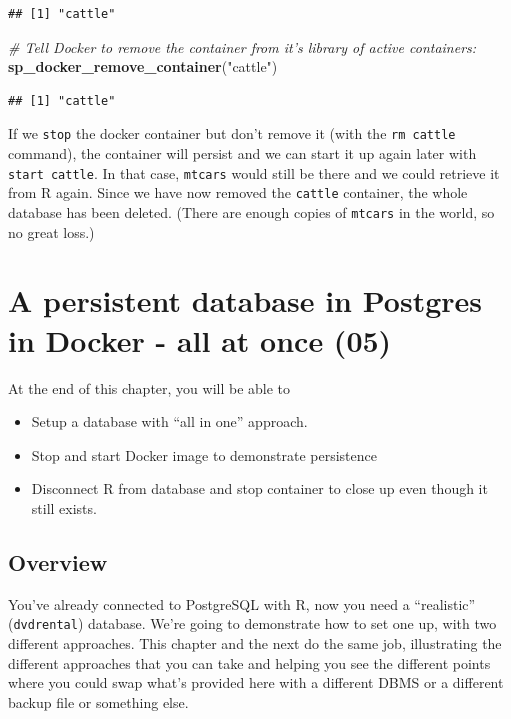 \documentclass[]{book}
\newenvironment{Shaded}{\begin{snugshade}}{\end{snugshade}}
\newcommand{\CommentTok}[1]{\textcolor[rgb]{0.56,0.35,0.01}{\textit{#1}}}
\newcommand{\KeywordTok}[1]{\textcolor[rgb]{0.13,0.29,0.53}{\textbf{#1}}}
\newcommand{\NormalTok}[1]{#1}
\newcommand{\StringTok}[1]{\textcolor[rgb]{0.31,0.60,0.02}{#1}}
\providecommand{\tightlist}{%
  \setlength{\itemsep}{0pt}\setlength{\parskip}{0pt}}
\theoremstyle{definition}
\theoremstyle{definition}
\theoremstyle{definition}
\theoremstyle{remark}
\begin{document}
\begin{verbatim}
## [1] "cattle"
\end{verbatim}

\begin{Shaded}
\begin{Highlighting}[]
\CommentTok{# Tell Docker to remove the container from it's library of active containers:}
\KeywordTok{sp_docker_remove_container}\NormalTok{(}\StringTok{"cattle"}\NormalTok{)}
\end{Highlighting}
\end{Shaded}

\begin{verbatim}
## [1] "cattle"
\end{verbatim}

If we \texttt{stop} the docker container but don't remove it (with the
\texttt{rm\ cattle} command), the container will persist and we can
start it up again later with \texttt{start\ cattle}. In that case,
\texttt{mtcars} would still be there and we could retrieve it from R
again. Since we have now removed the \texttt{cattle} container, the
whole database has been deleted. (There are enough copies of
\texttt{mtcars} in the world, so no great loss.)

\hypertarget{a-persistent-database-in-postgres-in-docker---all-at-once-05}{%
\chapter{A persistent database in Postgres in Docker - all at once
(05)}\label{a-persistent-database-in-postgres-in-docker---all-at-once-05}}

At the end of this chapter, you will be able to

\begin{itemize}
\tightlist
\item
  Setup a database with ``all in one'' approach.
\item
  Stop and start Docker image to demonstrate persistence
\item
  Disconnect R from database and stop container to close up even though
  it still exists.
\end{itemize}

\hypertarget{overview}{%
\section{Overview}\label{overview}}

You've already connected to PostgreSQL with R, now you need a
``realistic'' (\texttt{dvdrental}) database. We're going to demonstrate
how to set one up, with two different approaches. This chapter and the
next do the same job, illustrating the different approaches that you can
take and helping you see the different points where you could swap
what's provided here with a different DBMS or a different backup file or
something else.
\end{document}

